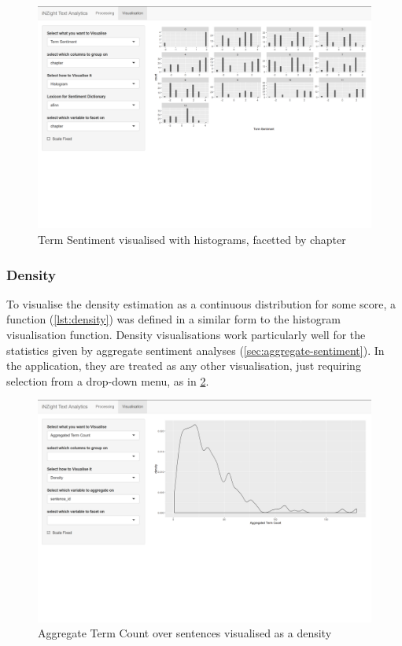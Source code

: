 \documentclass[11pt, a4paper, twoside, titlepage]{report}
\begin{document}
\begin{figure}
\centering
\includegraphics[scale=0.35]{visualisation-term-sentiment-hist-facet.png}
\caption{Term Sentiment visualised with histograms, facetted by chapter\label{fig:visualisation-term-sentiment-hist-facet}}
\end{figure}

\subsubsection{Density}\label{sec:density}

To visualise the density estimation as a continuous distribution for
some score, a function (\cref{lst:density}) was defined in a similar
form to the histogram visualisation function. Density visualisations
work particularly well for the statistics given by aggregate sentiment
analyses (\cref{sec:aggregate-sentiment}). In the application, they
are treated as any other visualisation, just requiring selection from
a drop-down menu, as in
\cref{fig:visualisation-agg-term-count-density}.

\begin{figure}
\centering
\includegraphics[scale=0.35]{visualisation-agg-term-count-density.png}
\caption{Aggregate Term Count over sentences visualised as a density\label{fig:visualisation-agg-term-count-density}}
\end{figure}
\end{document}
